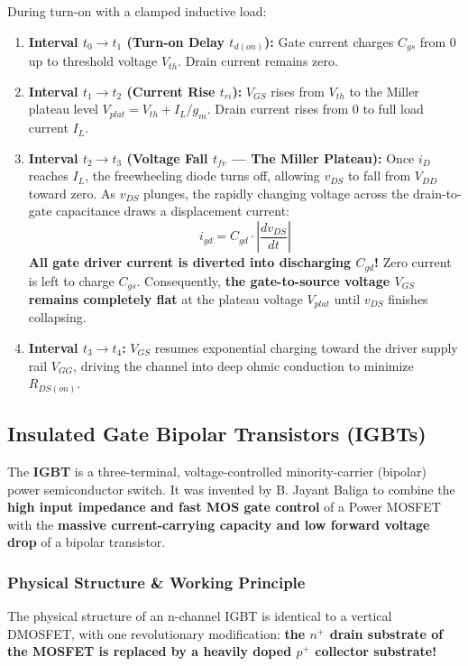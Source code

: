\documentclass[11pt,a4paper]{article}
\begin{document}
\begin{conceptbox}
During turn-on with a clamped inductive load:
\begin{enumerate}
  \item \textbf{Interval $t_0 \to t_1$ (Turn-on Delay $t_{d(on)}$):} Gate current charges $C_{gs}$ from $0$ up to threshold voltage $V_{th}$. Drain current remains zero.
  \item \textbf{Interval $t_1 \to t_2$ (Current Rise $t_{ri}$):} $V_{GS}$ rises from $V_{th}$ to the Miller plateau level $V_{plat} = V_{th} + I_L / g_m$. Drain current rises from $0$ to full load current $I_L$.
  \item \textbf{Interval $t_2 \to t_3$ (Voltage Fall $t_{fv}$ --- The Miller Plateau):} 
    Once $i_D$ reaches $I_L$, the freewheeling diode turns off, allowing $v_{DS}$ to fall from $V_{DD}$ toward zero. 
    As $v_{DS}$ plunges, the rapidly changing voltage across the drain-to-gate capacitance draws a displacement current:
    \begin{equation}
    i_{gd} = C_{gd} \cdot \left|\frac{dv_{DS}}{dt}\right|
    \end{equation}
    \textbf{All gate driver current is diverted into discharging $C_{gd}$!} Zero current is left to charge $C_{gs}$. Consequently, \textbf{the gate-to-source voltage $V_{GS}$ remains completely flat} at the plateau voltage $V_{plat}$ until $v_{DS}$ finishes collapsing.
  \item \textbf{Interval $t_3 \to t_4$:} $V_{GS}$ resumes exponential charging toward the driver supply rail $V_{GG}$, driving the channel into deep ohmic conduction to minimize $R_{DS(on)}$.
\end{enumerate}
\end{conceptbox}

\subsection{Insulated Gate Bipolar Transistors (IGBTs)}

The \textbf{IGBT} is a three-terminal, voltage-controlled minority-carrier (bipolar) power semiconductor switch. It was invented by B. Jayant Baliga to combine the \textbf{high input impedance and fast MOS gate control} of a Power MOSFET with the \textbf{massive current-carrying capacity and low forward voltage drop} of a bipolar transistor.

\subsubsection{Physical Structure \& Working Principle}
The physical structure of an n-channel IGBT is identical to a vertical DMOSFET, with one revolutionary modification: \textbf{the $n^+$ drain substrate of the MOSFET is replaced by a heavily doped $p^+$ collector substrate!}
\end{document}
